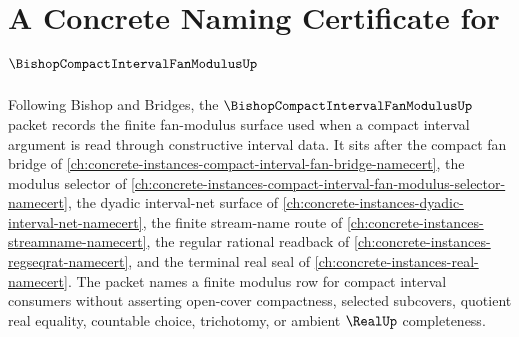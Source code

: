 \chapter{A Concrete Naming Certificate for $\BishopCompactIntervalFanModulusUp$}
\label{ch:concrete-instances-bishop-compact-interval-fan-modulus-namecert}

Following Bishop and Bridges, the $\BishopCompactIntervalFanModulusUp$ packet records the finite fan-modulus surface used when a compact interval argument is read through constructive interval data. It sits after the compact fan bridge of \autoref{ch:concrete-instances-compact-interval-fan-bridge-namecert}, the modulus selector of \autoref{ch:concrete-instances-compact-interval-fan-modulus-selector-namecert}, the dyadic interval-net surface of \autoref{ch:concrete-instances-dyadic-interval-net-namecert}, the finite stream-name route of \autoref{ch:concrete-instances-streamname-namecert}, the regular rational readback of \autoref{ch:concrete-instances-regseqrat-namecert}, and the terminal real seal of \autoref{ch:concrete-instances-real-namecert}. The packet names a finite modulus row for compact interval consumers without asserting open-cover compactness, selected subcovers, quotient real equality, countable choice, trichotomy, or ambient $\RealUp$ completeness.

